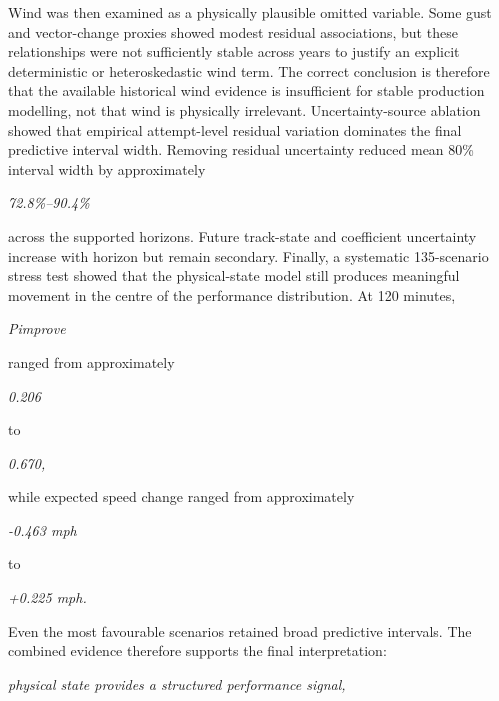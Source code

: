 Wind was then examined as a physically plausible omitted variable. Some gust and vector-change proxies showed modest residual associations, but these relationships were not sufficiently stable across years to justify an explicit deterministic or heteroskedastic wind term. The correct conclusion is therefore that the available historical wind evidence is insufficient for stable production modelling, not that wind is physically irrelevant. Uncertainty-source ablation showed that empirical attempt-level residual variation dominates the final predictive interval width. Removing residual uncertainty reduced mean 80\% interval width by approximately

\begin{center}\textit{72.8\%--90.4\%}\end{center}

across the supported horizons. Future track-state and coefficient uncertainty increase with horizon but remain secondary. Finally, a systematic 135-scenario stress test showed that the physical-state model still produces meaningful movement in the centre of the performance distribution. At 120 minutes,

\begin{center}\textit{Pimprove}\end{center}

ranged from approximately

\begin{center}\textit{0.206}\end{center}

to

\begin{center}\textit{0.670,}\end{center}

while expected speed change ranged from approximately

\begin{center}\textit{-0.463 mph}\end{center}

to

\begin{center}\textit{+0.225 mph.}\end{center}

Even the most favourable scenarios retained broad predictive intervals. The combined evidence therefore supports the final interpretation:

\begin{center}\textit{physical state provides a structured performance signal,}\end{center}

